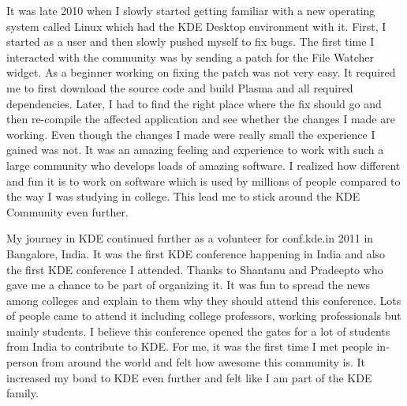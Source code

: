 

\noindent{}It was late 2010 when I slowly started getting familiar with a new operating system called Linux which had the KDE Desktop environment with it. First, I started as a user and then slowly pushed myself to fix bugs. The first time I interacted with the community was by sending a patch for the File Watcher widget. As a beginner working on fixing the patch was not very easy. It required me to first download the source code and build Plasma and all required dependencies. Later, I had to find the right place where the fix should go and then re-compile the affected application and see whether the changes I made are working. Even though the changes I made were really small the experience I gained was not. It was an amazing feeling and experience to work with such a large community who develops loads of amazing software. I realized how different and fun it is to work on software which is used by millions of people compared to the way I was studying in college. This lead me to stick around the KDE Community even further.

My journey in KDE continued further as a volunteer for conf.kde.in 2011 in Bangalore, India. It was the first KDE conference happening in India and also the first KDE conference I attended. Thanks to Shantanu and Pradeepto who gave me a chance to be part of organizing it. It was fun to spread the news among colleges and explain to them why they should attend this conference. Lots of people came to attend it including college professors, working professionals but mainly students. I believe this conference opened the gates for a lot of students from India to contribute to KDE. For me, it was the first time I met people in-person from around the world and felt how awesome this community is. It increased my bond to KDE even further and felt like I am part of the KDE family.

